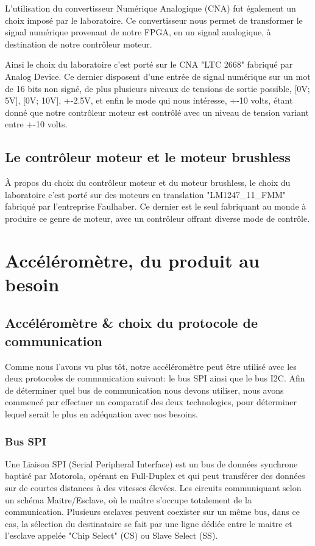 \documentclass[french,a4paper,12pt]{report}
\begin{document}
			L'utilisation du convertisseur Numérique Analogique (CNA) fut également un choix imposé par le laboratoire.
			Ce convertisseur nous permet de transformer le signal numérique provenant de notre FPGA, en un signal analogique, à destination de notre contrôleur moteur.
			
			Ainsi le choix du laboratoire c'est porté sur le CNA "LTC 2668" fabriqué par Analog Device.
			Ce dernier disposent d'une entrée de signal numérique sur un mot de 16 bits non signé, de plus plusieurs niveaux de tensions de sortie possible, [0V; 5V], [0V; 10V], +-2.5V, et enfin le mode qui nous intéresse, +-10 volts, étant donné que notre contrôleur moteur est contrôlé avec un niveau de tension variant entre +-10 volts.
	
			\section{Le contrôleur moteur et le moteur brushless}
			
			À propos du choix du contrôleur moteur et du moteur brushless, le choix du laboratoire c'est porté sur des moteurs en translation "LM1247\_11\_FMM" fabriqué par l'entreprise Faulhaber. Ce dernier est le seul fabriquant au monde à produire ce genre de moteur, avec un contrôleur offrant diverse mode de contrôle.
			
			
		\chapter{Accéléromètre, du produit au besoin}
			
			\section{Accéléromètre \& choix du protocole de communication}
				Comme nous l'avons vu plus tôt, notre accéléromètre peut être utilisé avec les deux protocoles de communication suivant: le bus SPI ainsi que le bus I2C. Afin de déterminer quel bus de communication nous devons utiliser, nous avons commencé par effectuer un comparatif des deux technologies, pour déterminer lequel serait le plus en adéquation avec nos besoins.
				
			\subsection{Bus SPI}
			
			Une Liaison SPI (Serial Peripheral Interface) est un bus de données synchrone baptisé par Motorola, opérant en Full-Duplex et qui peut transférer des données sur de courtes distances à des vitesses élevées. Les circuits communiquant selon un schéma Maitre/Esclave, où le maître s'occupe totalement de la communication. Plusieurs esclaves peuvent coexister sur un même bus, dans ce cas, la sélection du destinataire se fait par une ligne dédiée entre le maitre et l'esclave appelée "Chip Select" (CS) ou Slave Select (SS).
 
\end{document}
